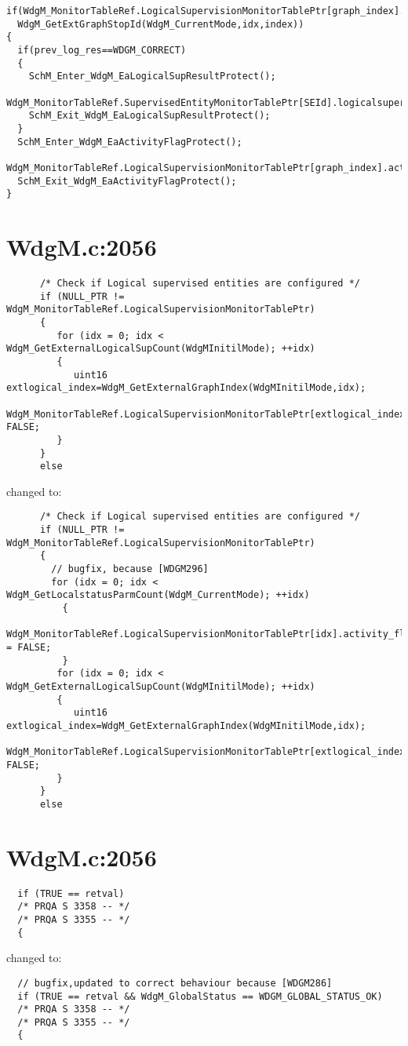 \documentclass[11pt,a4paper]{article}
\begin{document}
\begin{lstlisting}
if(WdgM_MonitorTableRef.LogicalSupervisionMonitorTablePtr[graph_index].most_recently_reported==
  WdgM_GetExtGraphStopId(WdgM_CurrentMode,idx,index))
{
  if(prev_log_res==WDGM_CORRECT)
  {
    SchM_Enter_WdgM_EaLogicalSupResultProtect();
    WdgM_MonitorTableRef.SupervisedEntityMonitorTablePtr[SEId].logicalsupervision_result=WDGM_CORRECT;
    SchM_Exit_WdgM_EaLogicalSupResultProtect();
  }
  SchM_Enter_WdgM_EaActivityFlagProtect();
  WdgM_MonitorTableRef.LogicalSupervisionMonitorTablePtr[graph_index].activity_flag=FALSE;
  SchM_Exit_WdgM_EaActivityFlagProtect();
}
\end{lstlisting}

\newpage
\section{WdgM.c:2056}
\begin{lstlisting}
      /* Check if Logical supervised entities are configured */
      if (NULL_PTR != WdgM_MonitorTableRef.LogicalSupervisionMonitorTablePtr)
      {
         for (idx = 0; idx < WdgM_GetExternalLogicalSupCount(WdgMInitilMode); ++idx)
         {
            uint16 extlogical_index=WdgM_GetExternalGraphIndex(WdgMInitilMode,idx);
            WdgM_MonitorTableRef.LogicalSupervisionMonitorTablePtr[extlogical_index].activity_flag= FALSE;
         }
      }
      else
\end{lstlisting}
changed to:
\begin{lstlisting}
      /* Check if Logical supervised entities are configured */
      if (NULL_PTR != WdgM_MonitorTableRef.LogicalSupervisionMonitorTablePtr)
      {
        // bugfix, because [WDGM296]
        for (idx = 0; idx < WdgM_GetLocalstatusParmCount(WdgM_CurrentMode); ++idx)
          {
            WdgM_MonitorTableRef.LogicalSupervisionMonitorTablePtr[idx].activity_flag = FALSE;
          }
         for (idx = 0; idx < WdgM_GetExternalLogicalSupCount(WdgMInitilMode); ++idx)
         {
            uint16 extlogical_index=WdgM_GetExternalGraphIndex(WdgMInitilMode,idx);
            WdgM_MonitorTableRef.LogicalSupervisionMonitorTablePtr[extlogical_index].activity_flag= FALSE;
         }
      }
      else
\end{lstlisting}

\newpage
\section{WdgM.c:2056}
\begin{lstlisting}
  if (TRUE == retval)
  /* PRQA S 3358 -- */
  /* PRQA S 3355 -- */
  {
\end{lstlisting}
changed to:
\begin{lstlisting}
  // bugfix,updated to correct behaviour because [WDGM286]
  if (TRUE == retval && WdgM_GlobalStatus == WDGM_GLOBAL_STATUS_OK)
  /* PRQA S 3358 -- */
  /* PRQA S 3355 -- */
  {
\end{lstlisting}
\end{document}
